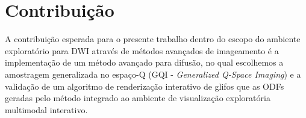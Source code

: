 \documentclass[
    12pt,                %
    oneside,            %
    a4paper,            %
    english,            %
    french,                %
    spanish,            %
    brazil                %
    ]{abntex2}
\begin{document}















\section{Contribuição}
\label{sec:contribuicoes}

A contribuição esperada para o presente trabalho dentro do escopo do ambiente exploratório para DWI através de métodos avançados de imageamento é a implementação de um método avançado para difusão, no qual escolhemos a amostragem generalizada no espaço-Q (GQI - \textit{Generalized Q-Space Imaging}) \cite{yeh2010} e a validação de um algoritmo de renderização interativo de glifos que as ODFs geradas pelo método integrado ao ambiente de visualização exploratória multimodal interativo.
\end{document}
